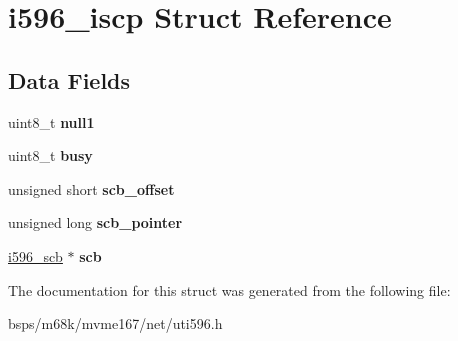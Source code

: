 \hypertarget{structi596__iscp}{}\section{i596\+\_\+iscp Struct Reference}
\label{structi596__iscp}
\subsection*{Data Fields}
\begin{DoxyCompactItemize}
\item 
\mbox{\label{structi596__iscp_a36ab95142b583cf2b783d7b8817dd189}} 
uint8\+\_\+t {\bfseries null1}
\item 
\mbox{\label{structi596__iscp_a967e71002632d070105a19d3b05a3846}} 
uint8\+\_\+t {\bfseries busy}
\item 
\mbox{\label{structi596__iscp_a92baeaccdef4130688f5ae3fa2b5ccba}} 
unsigned short {\bfseries scb\+\_\+offset}
\item 
\mbox{\label{structi596__iscp_a122cd879160ebb41864ec3434e94837b}} 
unsigned long {\bfseries scb\+\_\+pointer}
\item 
\mbox{\label{structi596__iscp_a8ee7fbb37c3c31052ff4a06168fc7676}} 
\mbox{\hyperlink{structi596__scb}{i596\+\_\+scb}} $\ast$ {\bfseries scb}
\end{DoxyCompactItemize}


The documentation for this struct was generated from the following file\+:\begin{DoxyCompactItemize}
\item 
bsps/m68k/mvme167/net/uti596.\+h\end{DoxyCompactItemize}
